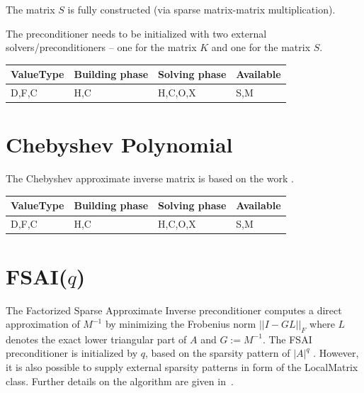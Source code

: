 The matrix $S$ is fully constructed (via sparse matrix-matrix multiplication). 

The preconditioner needs to be initialized with two external solvers/preconditioners -- one for the matrix $K$ and one for the matrix $S$. 

\begin{table}[H]
\begin{tabular}{l|l|l|l}
\multicolumn{1}{c|}{ValueType} & Building phase & Solving phase & Available \\ \hline
D,F,C                          & H,C            & H,C,O,X       & S,M      
\end{tabular}
\end{table}




\section{Chebyshev Polynomial}

The Chebyshev approximate inverse matrix is based on the work \cite{chebpoly}.

\begin{table}[H]
\begin{tabular}{l|l|l|l}
\multicolumn{1}{c|}{ValueType} & Building phase & Solving phase & Available \\ \hline
D,F,C                          & H,C            & H,C,O,X       & S,M      
\end{tabular}
\end{table}




\section{FSAI($q$)}

The Factorized Sparse Approximate Inverse preconditioner computes a direct approximation
of $M^{-1}$ by minimizing the Frobenius norm $||I-GL||_F$ where $L$ denotes the
exact lower triangular part of $A$ and $G:=M^{-1}$. The FSAI preconditioner is
initialized by $q$, based on the sparsity pattern of $\left|A\right|^q$ \cite{Lukarski2012}. 
However, it is also possible to supply external sparsity patterns in form of the LocalMatrix class.
Further details on the algorithm are given in~\cite{kolotilina}.

